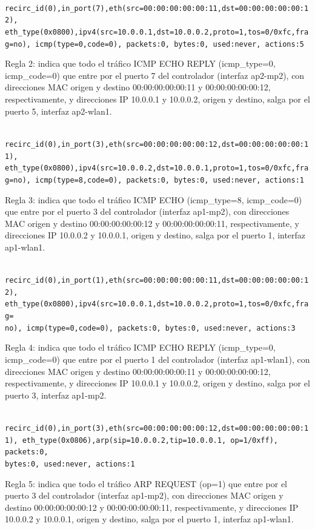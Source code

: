 \documentclass[a4paper,12pt,twoside,spanish]{book}
\begin{document}
\noindent\texttt{
	recirc\_id(0),in\_port(7),eth(src=00:00:00:00:00:11,dst=00:00:00:00:00:12),
	eth\_type(0x0800),ipv4(src=10.0.0.1,dst=10.0.0.2,proto=1,tos=0/0xfc,frag=no),
	icmp(type=0,code=0), packets:0, bytes:0, 	used:never, actions:5
}

Regla 2: indica que todo el tráfico ICMP ECHO REPLY (icmp\_type=0, icmp\_code=0) que entre por el puerto 7 del controlador (interfaz ap2-mp2), con direcciones MAC origen y destino 00:00:00:00:00:11 y 00:00:00:00:00:12, respectivamente, y direcciones IP 10.0.0.1 y 10.0.0.2, origen y destino, salga por el puerto 5, interfaz ap2-wlan1.\par 

\noindent\texttt{
	recirc\_id(0),in\_port(3),eth(src=00:00:00:00:00:12,dst=00:00:00:00:00:11),
	eth\_type(0x0800),ipv4(src=10.0.0.2,dst=10.0.0.1,proto=1,tos=0/0xfc,frag=no),
	icmp(type=8,code=0), packets:0, bytes:0, 	used:never, actions:1
}

Regla 3: indica que todo el tráfico ICMP ECHO (icmp\_type=8, icmp\_code=0) que entre por el puerto 3 del controlador (interfaz ap1-mp2), con direcciones MAC origen y destino 00:00:00:00:00:12 y 00:00:00:00:00:11, respectivamente, y direcciones IP 10.0.0.2 y 10.0.0.1, origen y destino, salga por el puerto 1, interfaz ap1-wlan1.\par 


\noindent\texttt{
	recirc\_id(0),in\_port(1),eth(src=00:00:00:00:00:11,dst=00:00:00:00:00:12),
	eth\_type(0x0800),ipv4(src=10.0.0.1,dst=10.0.0.2,proto=1,tos=0/0xfc,frag=\\no),
	icmp(type=0,code=0), packets:0, bytes:0, 	used:never, actions:3
}

Regla 4: indica que todo el tráfico ICMP ECHO REPLY (icmp\_type=0, icmp\_code=0) que entre por el puerto 1 del controlador (interfaz ap1-wlan1), con direcciones MAC origen y destino 00:00:00:00:00:11 y 00:00:00:00:00:12, respectivamente, y direcciones IP 10.0.0.1 y 10.0.0.2, origen y destino, salga por el puerto 3, interfaz ap1-mp2.\par 

\noindent\texttt{
	recirc\_id(0),in\_port(3),eth(src=00:00:00:00:00:12,dst=00:00:00:00:00:11),
	eth\_type(0x0806),arp(sip=10.0.0.2,tip=10.0.0.1,
	op=1/0xff), packets:0,\\
	bytes:0, used:never, actions:1
}

Regla 5: indica que todo el tráfico ARP REQUEST (op=1) que entre por el puerto 3 del controlador (interfaz ap1-mp2), con direcciones MAC origen y destino 00:00:00:00:00:12 y 00:00:00:00:00:11, respectivamente, y direcciones IP 10.0.0.2 y 10.0.0.1, origen y destino, salga por el puerto 1, interfaz ap1-wlan1.\par
\end{document}
